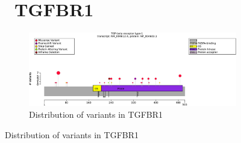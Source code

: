 \begin{figure}[htbp]
\section*{ TGFBR1}
\centering
\begin{subfigure}[b]{0.95\textwidth}
\centering
\includegraphics[width=\textwidth]{ img/TGFBR1_protein_diagram.pdf} 
\captionsetup{justification=raggedright,singlelinecheck=false}
\caption{Distribution of variants in TGFBR1}
\end{subfigure}

\vspace{2em}


\end{figure}
